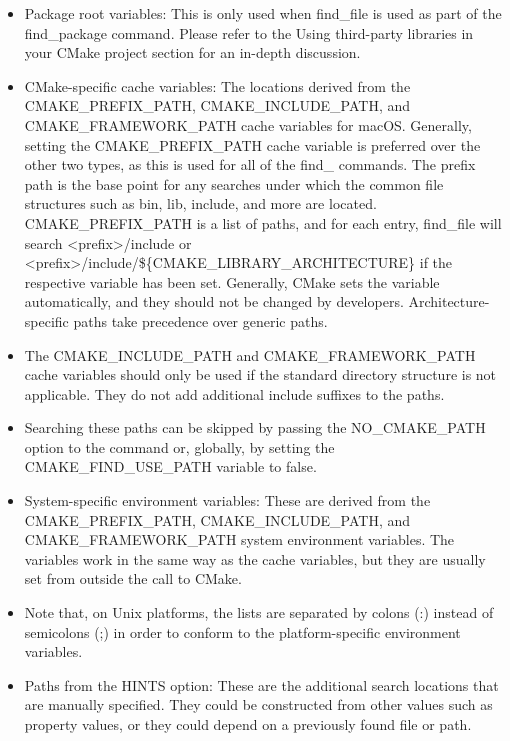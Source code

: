 \begin{itemize}
\item 
Package root variables: This is only used when find\_file is used as part of the find\_package command. Please refer to the Using third-party libraries in your CMake project section for an in-depth discussion.

\item 
CMake-specific cache variables: The locations derived from the CMAKE\_PREFIX\_PATH, CMAKE\_INCLUDE\_PATH, and CMAKE\_FRAMEWORK\_PATH cache variables for macOS. Generally, setting the CMAKE\_PREFIX\_PATH cache variable is preferred over the other two types, as this is used for all of the find\_ commands. The prefix path is the base point for any searches under which the common file structures such as bin, lib, include, and more are located. CMAKE\_PREFIX\_PATH is a list of paths, and for each entry, find\_file will search <prefix>/include or <prefix>/include/\$\{CMAKE\_LIBRARY\_ARCHITECTURE\} if the respective variable has been set. Generally, CMake sets the variable automatically, and they should not be changed by developers. Architecture-specific paths take precedence over generic paths.

\item 
The CMAKE\_INCLUDE\_PATH and CMAKE\_FRAMEWORK\_PATH cache variables should only be used if the standard directory structure is not applicable. They do not add additional include suffixes to the paths.

\item 
Searching these paths can be skipped by passing the NO\_CMAKE\_PATH option to the command or, globally, by setting the CMAKE\_FIND\_USE\_PATH variable to false.

\item 
System-specific environment variables: These are derived from the CMAKE\_PREFIX\_PATH, CMAKE\_INCLUDE\_PATH, and CMAKE\_FRAMEWORK\_PATH system environment variables. The variables work in the same way as the cache variables, but they are usually set from outside the call to CMake.

\item 
Note that, on Unix platforms, the lists are separated by colons (:) instead of semicolons (;) in order to conform to the platform-specific environment variables.

\item 
Paths from the HINTS option: These are the additional search locations that are manually specified. They could be constructed from other values such as property values, or they could depend on a previously found file or path.


\end{itemize}
